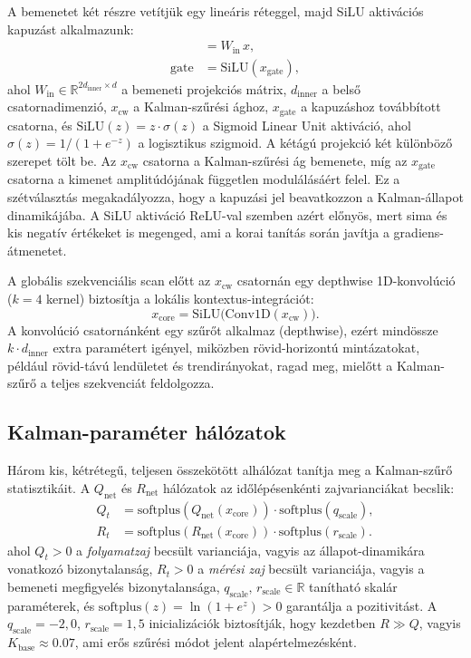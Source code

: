 A bemenetet két részre vetítjük egy lineáris réteggel,
majd SiLU aktivációs kapuzást alkalmazunk:
\begin{align}
    [x_\text{cw},\; x_\text{gate}] &= W_\text{in}\, x, \\
    \text{gate} &= \mathrm{SiLU}(x_\text{gate}),
\end{align}
ahol $W_\text{in} \in \mathbb{R}^{2d_\text{inner} \times d}$ a bemeneti projekciós
mátrix, $d_\text{inner}$ a belső csatornadimenzió, $x_\text{cw}$ a
Kalman-szűrési ághoz, $x_\text{gate}$ a kapuzáshoz továbbított csatorna,
és $\mathrm{SiLU}(z) = z \cdot \sigma(z)$ a Sigmoid Linear Unit aktiváció,
ahol $\sigma(z) = 1/(1+e^{-z})$ a logisztikus szigmoid.
A kétágú projekció két különböző szerepet tölt be.
Az $x_\text{cw}$ csatorna a Kalman-szűrési ág bemenete, míg az $x_\text{gate}$
csatorna a kimenet amplitúdójának független modulálásáért felel.
Ez a szétválasztás megakadályozza, hogy a kapuzási jel beavatkozzon a
Kalman-állapot dinamikájába.
A SiLU aktiváció ReLU-val szemben azért előnyös, mert sima és kis negatív
értékeket is megenged, ami a korai tanítás során javítja a gradiens-átmenetet.

A globális szekvenciális scan előtt az $x_\text{cw}$ csatornán egy depthwise
1D-konvolúció ($k=4$ kernel) biztosítja a lokális kontextus-integrációt:
\begin{equation}
    x_\text{core} = \mathrm{SiLU}\bigl(\mathrm{Conv1D}(x_\text{cw})\bigr).
\end{equation}
A konvolúció csatornánként egy szűrőt alkalmaz (depthwise), ezért mindössze
$k \cdot d_\text{inner}$ extra paramétert igényel, miközben
rövid-horizontú mintázatokat, például rövid-távú lendületet és trendirányokat,
ragad meg, mielőtt a Kalman-szűrő a teljes szekvenciát feldolgozza.

\subsection{Kalman-paraméter hálózatok}

Három kis, kétrétegű, teljesen összekötött alhálózat tanítja meg a Kalman-szűrő statisztikáit.
A $Q_\text{net}$ és $R_\text{net}$ hálózatok az időlépésenkénti
zajvarianciákat becslik:
\begin{align}
    Q_t &= \mathrm{softplus}(Q_\text{net}(x_\text{core})) \cdot
           \mathrm{softplus}(q_\text{scale}), \label{eq:Q_net}\\
    R_t &= \mathrm{softplus}(R_\text{net}(x_\text{core})) \cdot
           \mathrm{softplus}(r_\text{scale}). \label{eq:R_net}
\end{align}
ahol $Q_t > 0$ a \emph{folyamatzaj} becsült varianciája, vagyis az állapot-dinamikára
vonatkozó bizonytalanság, $R_t > 0$ a \emph{mérési zaj} becsült varianciája,
vagyis a bemeneti megfigyelés bizonytalansága,
$q_\text{scale},\, r_\text{scale} \in \mathbb{R}$ tanítható skalár
paraméterek, és $\mathrm{softplus}(z) = \ln(1+e^z) > 0$
garantálja a pozitivitást.
A $q_\text{scale} = -2{,}0$, $r_\text{scale} = 1{,}5$ inicializációk biztosítják,
hogy kezdetben $R \gg Q$, vagyis $K_\text{base} \approx 0.07$, ami erős szűrési
módot jelent alapértelmezésként.

